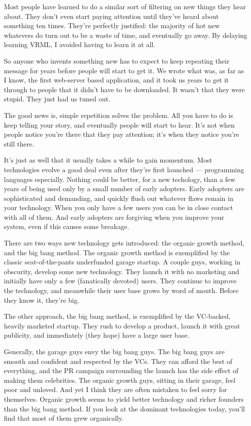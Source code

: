 Most people have learned to do a similar sort of filtering on new things
they hear about. They don't even start paying attention until they've
heard about something ten times. They're perfectly justified: the
majority of hot new whatevers do turn out to be a waste of time, and
eventually go away. By delaying learning VRML, I avoided having to learn
it at all.

So anyone who invents something new has to expect to keep repeating
their message for years before people will start to get it. We wrote
what was, as far as I know, the first web-server based application, and
it took us years to get it through to people that it didn't have to be
downloaded. It wasn't that they were stupid. They just had us tuned out.

The good news is, simple repetition solves the problem. All you have to
do is keep telling your story, and eventually people will start to hear.
It's not when people notice you're there that they pay attention; it's
when they notice you're still there.

It's just as well that it usually takes a while to gain momentum. Most
technologies evolve a good deal even after they're first launched ---
programming languages especially. Nothing could be better, for a new
techology, than a few years of being used only by a small number of
early adopters. Early adopters are sophisticated and demanding, and
quickly flush out whatever flaws remain in your technology. When you
only have a few users you can be in close contact with all of them. And
early adopters are forgiving when you improve your system, even if this
causes some breakage.

There are two ways new technology gets introduced: the organic growth
method, and the big bang method. The organic growth method is
exemplified by the classic seat-of-the-pants underfunded garage startup.
A couple guys, working in obscurity, develop some new technology. They
launch it with no marketing and initially have only a few (fanatically
devoted) users. They continue to improve the technology, and meanwhile
their user base grows by word of mouth. Before they know it, they're
big.

The other approach, the big bang method, is exemplified by the
VC-backed, heavily marketed startup. They rush to develop a product,
launch it with great publicity, and immediately (they hope) have a large
user base.

Generally, the garage guys envy the big bang guys. The big bang guys are
smooth and confident and respected by the VCs. They can afford the best
of everything, and the PR campaign surrounding the launch has the side
effect of making them celebrities. The organic growth guys, sitting in
their garage, feel poor and unloved. And yet I think they are often
mistaken to feel sorry for themselves. Organic growth seems to yield
better technology and richer founders than the big bang method. If you
look at the dominant technologies today, you'll find that most of them
grew organically.

